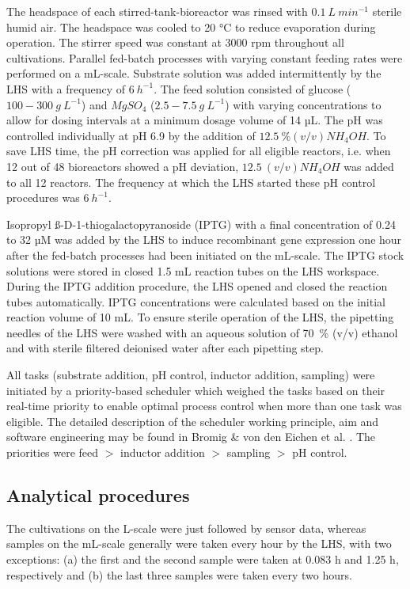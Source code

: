 \documentclass[sn-standardnature]{sn-jnl}%
\theoremstyle{thmstyleone}%
\theoremstyle{thmstyletwo}%
\theoremstyle{thmstylethree}%
\begin{document}
The headspace of each stirred-tank-bioreactor was rinsed with $0.1\ L\ min^{-1}$ sterile humid air.
The headspace was cooled to 20 °C to reduce evaporation during operation.
The stirrer speed was constant at 3000 rpm throughout all cultivations.
Parallel fed-batch processes with varying constant feeding rates were performed on a mL-scale.
Substrate solution was added intermittently by the LHS with a frequency of $6\ h^{-1}$.
The feed solution consisted of glucose ($100 - 300\ g\ L^{-1}$) and $MgSO_{4}$ ($2.5 - 7.5\ g\ L^{-1}$) with varying concentrations to allow for dosing intervals at a minimum dosage volume of 14 µL.
The pH was controlled individually at pH 6.9 by the addition of $12.5\ \% (v/v) NH_{4}OH$.
To save LHS time, the pH correction was applied for all eligible reactors, i.e. when 12 out of 48 bioreactors showed a pH deviation, $12.5\ (v/v) NH_{4}OH$ was added to all 12 reactors.
The frequency at which the LHS started these pH control procedures was $6\ h^{-1}$.

Isopropyl ß-D-1-thiogalactopyranoside (IPTG) with a final concentration of 0.24 to 32 µM was added by the LHS to induce recombinant gene expression one hour after the fed-batch processes had been initiated on the mL-scale.
The IPTG stock solutions were stored in closed 1.5 mL reaction tubes on the LHS workspace.
During the IPTG addition procedure, the LHS opened and closed the reaction tubes automatically.
IPTG concentrations were calculated based on the initial reaction volume of 10 mL.
To ensure sterile operation of the LHS, the pipetting needles of the LHS were washed with an aqueous solution of 70~\% (v/v) ethanol and with sterile filtered deionised water after each pipetting step.

All tasks (substrate addition, pH control, inductor addition, sampling) were initiated by a priority-based scheduler which weighed the tasks based on their real-time priority to enable optimal process control when more than one task was eligible.
The detailed description of the scheduler working principle, aim and software engineering may be found in Bromig \& von den Eichen et al. \cite{von2021automated}.
The priorities were feed $>$ inductor addition $>$ sampling $>$ pH control.

\subsection{Analytical procedures}
The cultivations on the L-scale were just followed by sensor data, whereas samples on the mL-scale generally were taken every hour by the LHS, with two exceptions:
(a) the first and the second sample were taken at 0.083 h and 1.25 h, respectively and (b) the last three samples were taken every two hours.
\end{document}
